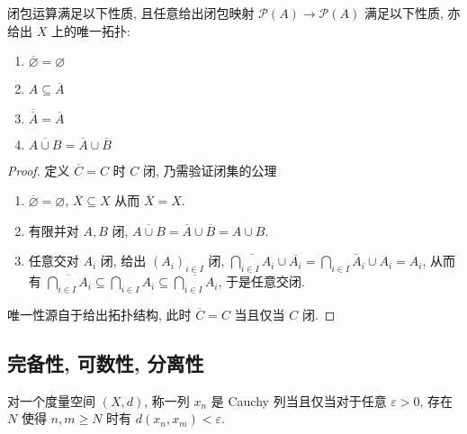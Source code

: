 \begin{axiom}
    \label {axiom:kuratowski closure}
    闭包运算满足以下性质, 且任意给出闭包映射 \(\mathcal{P} (A) \to \mathcal{P} (A)\) 满足以下性质, 亦给出 \(X\) 上的唯一拓扑:

    \begin{enumerate}
        \item \(\overline{\varnothing} = \varnothing\)
        \item \(A \subseteq \overline{A}\)
        \item \(\overline{\overline{A}} = \overline{A}\)
        \item \(\overline{A \cup B} = \overline{A} \cup \overline{B}\)
    \end{enumerate}

    \begin{proof}
        定义 \(\overline{C} = C\) 时 \(C\) 闭, 乃需验证闭集的公理

        \begin{enumerate}
            \item \(\overline{\varnothing} = \varnothing\), \(\overline{X} \subseteq X\) 从而 \(\overline{X} = X\).
            \item 有限并对 \(A,B\) 闭, \(\overline{A \cup B} = \overline{A} \cup \overline{B} = A \cup B\).
            \item 任意交对 \(A_i\) 闭, 给出 \({(A_i)}_{i \in I}\) 闭, \(\overline{\bigcap_{i \in I} A_i} \cup \overline{A_i} = \overline{\bigcap_{i \in I} A_i \cup A_i} = A_i\),
                    从而有 \(\overline{\bigcap_{i \in I} A_i} \subseteq \bigcap_{i \in I} A_i \subseteq \overline{\bigcap_{i \in I} A_i}\), 于是任意交闭.
        \end{enumerate}

        唯一性源自于给出拓扑结构, 此时 \(\overline{C} = C\) 当且仅当 \(C\) 闭.
    \end{proof}
\end{axiom}

\subsection{完备性, 可数性, 分离性}

\begin{definition}[Cauchy 列]
    对一个度量空间 \((X,d)\), 称一列 \(x_n\) 是 Cauchy 列当且仅当对于任意 \(\varepsilon > 0\), 存在 \(N\) 使得 \(n,m \ge N\) 时有 \(d(x_n,x_m) < \varepsilon\).
\end{definition}

